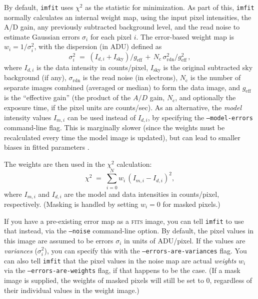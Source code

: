 \documentclass[10pt,a4paper,article]{memoir}
\newcommand{\imfitprog}{\texttt{imfit}}
\newcommand{\chisquare}{\ensuremath{\chi^{2}}}
\begin{document}
By default, \imfitprog{} uses \chisquare{} as the statistic for
minimization. As part of this, \imfitprog{} normally calculates an internal
weight map, using the input pixel intensities, the A/D gain, any
previously subtracted background level, and the read noise to estimate
Gaussian errors $\sigma_{i}$ for each pixel $i$. The error-based weight
map is $w_{i} = 1/\sigma^{2}_{i}$, with the dispersion (in ADU) defined as
\begin{equation}
\sigma^{2}_{i} \; = \; (I_{d, i} + I_{\mathrm{sky}})/g_{\mathrm{eff}} \, + \, N_{\mathrm{c}} \, \sigma_{\mathrm{rdn}}^{2}/g_{\mathrm{eff}}^{2} \, ,
\end{equation}
where $I_{d, i}$ is the data intensity in counts/pixel,
$I_{\mathrm{sky}}$ is the original subtracted sky background (if any),
$\sigma_{\mathrm{rdn}}$ is the read noise (in electrons),
$N_{\mathrm{c}}$ is the number of separate images combined (averaged or
median) to form the data image, and $g_{\mathrm{eff}}$ is the
``effective gain'' (the product of the $A/D$ gain,  $N_{\mathrm{c}}$,
and optionally the exposure time, if the pixel units are counts/sec).
As an alternative, the \textit{model} intensity values $I_{m, i}$ can be
used instead of $I_{d, i}$, by specifying the \texttt{--model-errors}
command-line flag. This is marginally slower (since the weights must be
recalculated every time the model image is updated), but can lead to
smaller biases in fitted parameters \citep[see][]{humphrey09,erwin14}.

The weights are then used in the \chisquare{} calculation:
\begin{equation}
\chisquare \; = \; \sum_{i = 0}^{N} w_{i} \, (I_{m, i} - I_{d, i})^2 ,
\end{equation}
where $I_{m, i}$ and $I_{d, i}$ are the model and data intensities
in counts/pixel, respectively. (Masking is handled by setting $w_{i} = 0$
for masked pixels.)

If you have a pre-existing error map as a \textsc{fits} image, you can tell \imfitprog{} to
use that instead, via the \texttt{--noise} command-line option. By default, the
pixel values in this image are assumed to be errors $\sigma_{i}$ in units of
ADU/pixel. If the values are \textit{variances} ($\sigma_{i}^2$), you can specify
this with the \texttt{--errors-are-variances} flag. You can also tell \imfitprog{}
that the pixel values in the noise map are actual \textit{weights} $w_{i}$ via the
\texttt{--errors-are-weights} flag, if that happens to be the case. (If a mask
image is supplied, the weights of masked pixels will still be set to 0,
regardless of their individual values in the weight image.)
\end{document}
